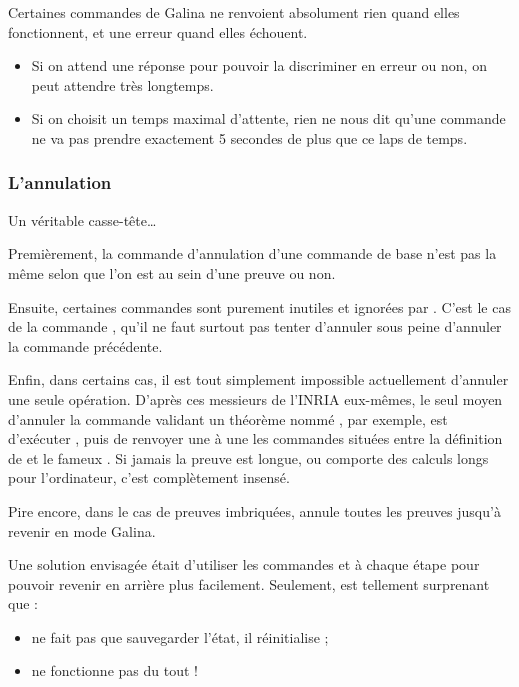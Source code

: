         	Certaines commandes de Galina ne renvoient absolument rien quand elles fonctionnent, et une erreur quand elles échouent.
        	\begin{itemize}
        		\item Si on attend une réponse pour pouvoir la discriminer en erreur ou non, on peut attendre très longtemps.
        		\item Si on choisit un temps maximal d'attente, rien ne nous dit qu'une commande ne va pas prendre exactement 5 secondes de plus que ce laps de temps.
        	\end{itemize}

    	\subsubsection{L'annulation}

    	    Un véritable casse-tête…
    	    
    	    Premièrement, la commande d'annulation d'une commande de base n'est pas la même selon que l'on est au sein d'une preuve ou non.
    	    
    	    Ensuite, certaines commandes sont purement inutiles et ignorées par \coqtop{}.
    	    C'est le cas de la commande , qu'il ne faut surtout pas tenter d'annuler sous peine d'annuler la commande précédente.
    	    
    	    Enfin, dans certains cas, il est tout simplement impossible actuellement d'annuler une seule opération.
    	    D'après ces messieurs de l'INRIA eux-mêmes, le seul moyen d'annuler la commande  validant un théorème nommé , par exemple, est d'exécuter , puis de renvoyer une à une les commandes situées entre la définition de  et le fameux .
    	    Si jamais la preuve est longue, ou comporte des calculs longs pour l'ordinateur, c'est complètement insensé.
    	    
    	    Pire encore, dans le cas de preuves imbriquées,  annule toutes les preuves jusqu'à revenir en mode Galina.
    	    
            Une solution envisagée était d'utiliser les commandes  et  à chaque étape pour pouvoir revenir en arrière plus facilement.
            Seulement, \coqtop{} est tellement surprenant que :
            \begin{itemize}
             	\item {} ne fait pas que sauvegarder l'état, il réinitialise \coqtop{} ;
             	\item {} ne fonctionne pas du tout !
             \end{itemize}
		
